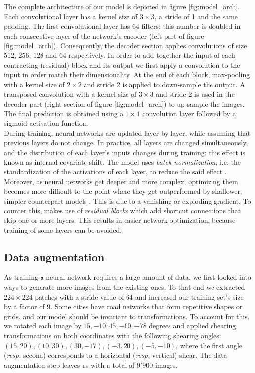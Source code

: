 \documentclass[10pt,conference,compsocconf]{IEEEtran}
\begin{document}
The complete architecture of our model is depicted in figure \ref{fig:model_arch}. Each convolutional layer has a kernel size of $3 \times 3$, a  stride of 1 and the same padding. The first convolutional layer has 64 filters: this number is doubled in each consecutive layer of the network's encoder (left part of figure \ref{fig:model_arch}). Consequently, the decoder section applies convolutions of size 512, 256, 128 and 64 respectively. In order to add together the input of each contracting (residual) block and its output we first apply a convolution to the input in order match their dimensionality. At the end of each block, max-pooling with a kernel size of $2 \times 2$ and stride 2 is applied to down-sample the output. A transposed convolution with a kernel size of $3 \times 3$ and stride 2 is used in the decoder part (right section of figure \ref{fig:model_arch}) to up-sample the images. The final prediction is obtained using a $1 \times 1$ convolution layer followed by a sigmoid activation function. \\

During training, neural networks are updated layer by layer, while assuming that previous layers do not change. In practice, all layers are changed simultaneously, and the distribution of each layer’s inputs changes during training: this effect is known as internal covariate shift. The model uses \textit{batch normalization}, i.e. the standardization of the activations of each layer, to reduce the said effect \cite{batchnorm}. \\

Moreover, as neural networks get deeper and more complex, optimizing them becomes more difficult to the point where they get outperformed by shallower, simpler counterpart models \cite{deep_residual_nn}. This is due to a vanishing or exploding gradient. To counter this, \cite{deep_residual_nn} makes use of \textit{residual blocks} which add shortcut connections that skip one or more layers. This results in easier network optimization, because training of some layers can be avoided.

\subsection{Data augmentation}

As training a neural network requires a large amount of data, we first looked into ways to generate more images from the existing ones. To that end we extracted $224 \times 224$ patches with a stride value of 64 and increased our training set's size by a factor of 9. Some cities have road networks that form repetitive shapes or grids, and our model should be invariant to transformations. To account for this, we rotated each image by $15, -10, 45, -60, -78$ degrees and applied shearing transformations on both coordinates with the following shearing angles: $(15, 20), (10, 30), (30, -17), (-3, 20), (-5, -10)$, where the first angle (\textit{resp.} second) corresponds to a horizontal (\textit{resp.} vertical) shear. The data augmentation step leaves us with a total of $9'900$ images.
\end{document}
